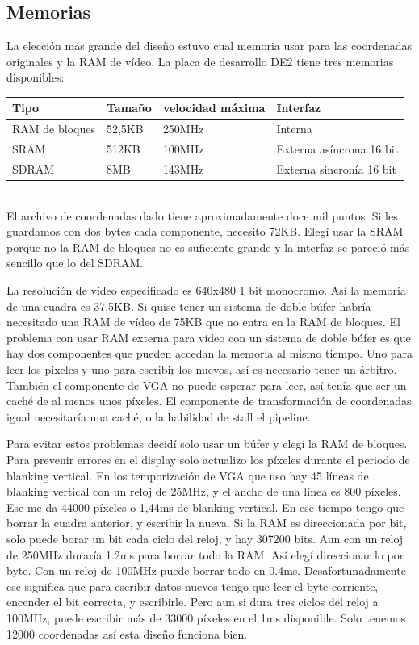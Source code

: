 \documentclass[a4paper]{article}
\begin{document}
\subsection{Memorias}

La elección más grande del diseño estuvo cual memoria usar para las coordenadas originales y la RAM de vídeo. La placa de desarrollo DE2 tiene tres memorias disponibles: \\

\begin{tabular}{| l | l | l | l |} \hline
\textbf{Tipo} & \textbf{Tamaño} & \textbf{velocidad máxima} & \textbf{Interfaz} \\ \hline
RAM de bloques & 52,5KB & 250MHz & Interna \\
SRAM & 512KB & 100MHz & Externa asíncrona 16 bit \\
SDRAM & 8MB & 143MHz & Externa sincronía 16 bit \\ \hline
\end{tabular} \\

El archivo de coordenadas dado tiene aproximadamente doce mil puntos. Si les guardamos con dos bytes cada componente, necesito 72KB. Elegí usar la SRAM porque no la RAM de bloques no es suficiente grande y la interfaz se pareció más sencillo que lo del SDRAM.

La resolución de vídeo especificado es 640x480 1 bit monocromo. Así la memoria de una cuadra es 37,5KB. Si quise tener un sistema de doble búfer habría necesitado una RAM de vídeo de 75KB que no entra en la RAM de bloques. El problema con usar RAM externa para vídeo con un sistema de doble búfer es que hay dos componentes que pueden accedan la memoria al mismo tiempo. Uno para leer los píxeles y uno para escribir los nuevos, así es necesario tener un árbitro. También el componente de VGA no puede esperar para leer, así tenía que ser un caché de al menos unos píxeles. El componente de transformación de coordenadas igual necesitaría una caché, o la habilidad de stall el pipeline.

Para evitar estos problemas decidí solo usar un búfer y elegí la RAM de bloques. Para prevenir errores en el display solo actualizo los píxeles durante el periodo de blanking vertical. En los temporización de VGA que uso hay 45 líneas de blanking vertical con un reloj de 25MHz, y el ancho de una línea es 800 píxeles. Ese me da 44000 píxeles o 1,44ms de blanking vertical. En ese tiempo tengo que borrar la cuadra anterior, y escribir la nueva. Si la RAM es direccionada por bit, solo puede borar un bit cada ciclo del reloj, y hay 307200 bits. Aun con un reloj de 250MHz duraría 1.2ms para borrar todo la RAM. Así elegí direccionar lo por byte. Con un reloj de 100MHz puede borrar todo en 0.4ms. Desafortunadamente ese significa que para escribir datos nuevos tengo que leer el byte corriente, encender el bit correcta, y escribirle. Pero aun si dura tres ciclos del reloj a 100MHz, puede escribir más de 33000 píxeles en el 1ms disponible. Solo tenemos 12000 coordenadas así esta diseño funciona bien.
\end{document}
